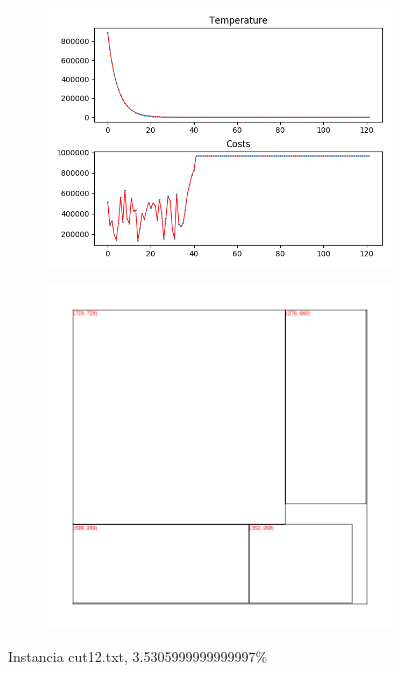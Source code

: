 
\begin{figure}
\centering
\begin{subfigure}{.5\textwidth}
  \centering
  \includegraphics[width=1\linewidth]{results/cut12/2/plot}
  \label{fig:sub1}
\end{subfigure}%
\begin{subfigure}{.5\textwidth}
  \centering
  \includegraphics[width=1\linewidth]{results/cut12/2/cut}
  \label{fig:sub2}
\end{subfigure}
\caption{Instancia cut12.txt, 3.5305999999999997\%}
\label{fig:test}
\end{figure}


